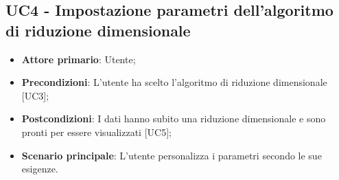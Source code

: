 \subsection{UC4 - Impostazione parametri dell'algoritmo di riduzione dimensionale}
\begin{itemize}
	\item \textbf{Attore primario}: Utente;
	\item \textbf{Precondizioni}: L'utente ha scelto l'algoritmo di riduzione dimensionale [UC3];
	\item \textbf{Postcondizioni}: I dati hanno subito una riduzione dimensionale e sono pronti per essere visualizzati [UC5];
	\item \textbf{Scenario principale}: L'utente personalizza i parametri secondo le sue esigenze.
\end{itemize}